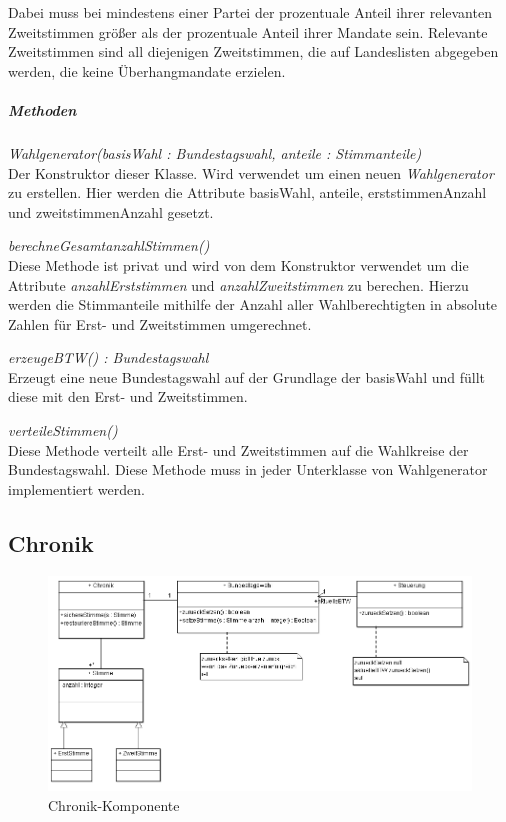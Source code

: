 \documentclass[12pt,a4paper,titlepage]{article}
\newcommand{\mymo}{\fontfamily{pcr}\selectfont \textit}
\begin{document}
Dabei muss bei mindestens einer Partei der prozentuale Anteil ihrer relevanten Zweitstimmen größer als der prozentuale Anteil ihrer Mandate sein. Relevante Zweitstimmen sind all diejenigen Zweitstimmen, die auf Landeslisten abgegeben werden, die keine Überhangmandate erzielen.

\subparagraph{Methoden}
\begin{description}
\item {\mymo{Wahlgenerator(basisWahl : Bundestagswahl, anteile : Stimmanteile)}} \\
Der Konstruktor dieser Klasse. Wird verwendet um einen neuen {\mymo{Wahlgenerator}} zu erstellen. Hier werden die Attribute basisWahl, anteile, erststimmenAnzahl und zweitstimmenAnzahl gesetzt.
\item {\mymo{berechneGesamtanzahlStimmen()}} \\
Diese Methode ist privat und wird von dem Konstruktor verwendet um die Attribute {\mymo{anzahlErststimmen}} und {\mymo{anzahlZweitstimmen}} zu berechen. Hierzu werden die Stimmanteile mithilfe der Anzahl aller Wahlberechtigten in absolute Zahlen für Erst- und Zweitstimmen umgerechnet.
\item {\mymo{erzeugeBTW() : Bundestagswahl}} \\
Erzeugt eine neue Bundestagswahl auf der Grundlage der basisWahl und füllt diese mit den Erst- und Zweitstimmen.
\item {\mymo{verteileStimmen()}} \\
Diese Methode verteilt alle Erst- und Zweitstimmen auf die Wahlkreise der Bundestagswahl. Diese Methode muss in jeder Unterklasse von Wahlgenerator implementiert werden.
\end{description}

\newpage
\subsection{Chronik}
\begin{figure}[!ht]
\centering
\includegraphics[scale=0.7]{Klassendiagramme/Chronik_Ausschnitt} \caption{Chronik-Komponente} 
\end{figure}
\end{document}
